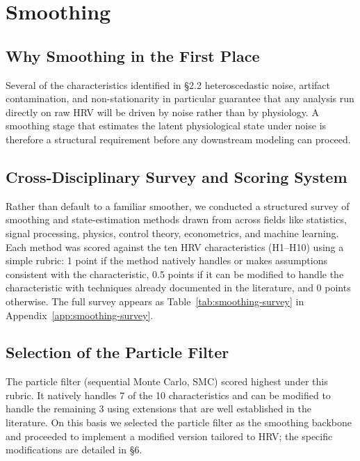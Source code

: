\documentclass[11pt, a4paper]{article}
\theoremstyle{plain}
\theoremstyle{definition}
\begin{document}
\section{Smoothing}

\subsection{Why Smoothing in the First Place}

Several of the characteristics identified in \S2.2 heteroscedastic noise,
artifact contamination, and non-stationarity in particular guarantee that
any analysis run directly on raw HRV will be driven by noise rather than by
physiology. A smoothing stage that estimates the latent physiological state
under noise is therefore a structural requirement before any downstream
modeling can proceed.

\subsection{Cross-Disciplinary Survey and Scoring System}

Rather than default to a familiar smoother, we conducted a structured
survey of smoothing and state-estimation methods drawn from across fields
like statistics, signal processing, physics, control theory, econometrics,
and machine learning. Each method was scored against the ten HRV
characteristics (H1--H10) using a simple rubric: 1 point if the method
natively handles or makes assumptions consistent with the characteristic,
0.5 points if it can be modified to handle the characteristic with
techniques already documented in the literature, and 0 points otherwise.
The full survey appears as Table~\ref{tab:smoothing-survey} in
Appendix~\ref{app:smoothing-survey}.

\subsection{Selection of the Particle Filter}

The particle filter (sequential Monte Carlo, SMC) scored highest under this
rubric. It natively handles 7 of the 10 characteristics and can be modified
to handle the remaining 3 using extensions that are well established in the
literature. On this basis we selected the particle filter as the smoothing
backbone and proceeded to implement a modified version tailored to HRV; the
specific modifications are detailed in \S6.
\end{document}
